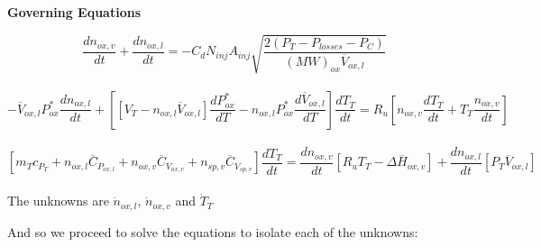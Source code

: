 \documentclass[10pt]{article}
\begin{document}
\begin{center}
    \textbf{Governing Equations}
\end{center}

\[
	\frac{dn_{ox,v}}{dt} + \frac{dn_{ox,l}}{dt} = -C_{d}N_{inj}A_{inj}\sqrt{\frac{2(P_{T}-P_{losses}-P_{C})}{(MW)_{ox}\overline{V}_{ox,l}}}
\]\\

\[
	-\overline{V}_{ox,l} P^{*}_{ox} \frac{dn_{ox,l}}{dt} + \left[ [V_{T}-n_{ox,l}\overline{V}_{ox,l}] \frac{dP^{*}_{ox}}{dT} -n_{ox,l} P^{*}_{ox} \frac{d\overline{V}_{ox,l}}{dT} \right] \frac{dT_{T}}{dt} = R_{u} \left[ n_{ox,v} \frac{dT_{T}}{dt} + T_{T} \frac{n_{ox,v}}{dt} \right]
\]\\

\[
	[m_{T}c_{P_{T}} + n_{ox,l}\overline{C}_{P_{ox,l}} + n_{ox,v}\overline{C}_{V_{ox,v}} + n_{sp,v}\overline{C}_{V_{sp,v}}]\frac{dT_{T}}{dt} = \frac{dn_{ox,v}}{dt} [R_{u}T_{T} - \Delta\overline{H}_{ox,v}] + \frac{dn_{ox,l}}{dt}[P_{T}\overline{V}_{ox,l}]
\]\\

The unknowns are $\dot{n}_{ox,l}$, $\dot{n}_{ox,v}$ and $\dot{T}_{T}$

And so we proceed to solve the equations to isolate each of the unknowns:
\end{document}
